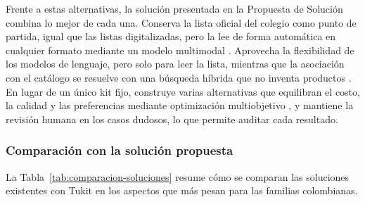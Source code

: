 Frente a estas alternativas, la solución presentada en la Propuesta de Solución combina
lo mejor de cada una. Conserva la lista oficial del colegio como punto de partida, igual que
las listas digitalizadas, pero la lee de forma automática en cualquier formato mediante un
modelo multimodal \citep{shen_ocr_2026}. Aprovecha la flexibilidad de los modelos de
lenguaje, pero solo para leer la lista, mientras que la asociación con el catálogo se
resuelve con una búsqueda híbrida que no inventa productos \citep{karpukhin_dense_2020}. En
lugar de un único kit fijo, construye varias alternativas que equilibran el costo, la
calidad y las preferencias mediante optimización multiobjetivo \citep{deb_fast_2002}, y
mantiene la revisión humana en los casos dudosos, lo que permite auditar cada resultado.\par

\subsubsection{Comparación con la solución propuesta}

La Tabla~\ref{tab:comparacion-soluciones} resume cómo se comparan las soluciones existentes
con Tukit en los aspectos que más pesan para las familias colombianas.\par

